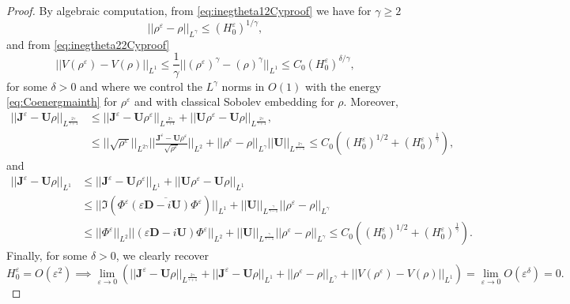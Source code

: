 \documentclass[a4paper, 15pt]{article}
\numberwithin{equation}{section}
\begin{document}
\begin{proof}
    By algebraic computation, from
  \eqref{eq:inegtheta12Cyproof} we have for $\gamma\geq2$ 
\begin{equation}
\label{eq:convtheta1osefCyproof}
    ||\rho^\varepsilon-\rho||_{L^\gamma}\leq (H^\varepsilon_0)^{1/\gamma},
\end{equation}
and from \eqref{eq:inegtheta22Cyproof}
\begin{equation}
\label{eq:convtheta2osefCyproof}
    ||V(\rho^\varepsilon)-V(\rho)||_{L^1}\leq\frac{1}{\gamma}||(\rho^\varepsilon)^\gamma-(\rho)^\gamma||_{L^1}\leq C_0(H^\varepsilon_0)^{\delta/\gamma},
\end{equation}
for some $\delta>0$ and where we control the $L^\gamma$ norms in $O(1)$ with the energy \eqref{eq:Coenergmainth} for $\rho^\varepsilon$ and with classical Sobolev embedding for $\rho$. Moreover,
\begin{align*}
     ||\textbf{J}^\varepsilon-\textbf{U}\rho||_{L^{\frac{2\gamma}{\gamma+1}}}&\leq  ||\textbf{J}^\varepsilon-\textbf{U}\rho^\varepsilon||_{L^{\frac{2\gamma}{\gamma+1}}}+||\textbf{U}\rho^\varepsilon-\textbf{U}\rho||_{L^{\frac{2\gamma}{\gamma+1}}},\\
     &\leq||\sqrt{\rho^\varepsilon}||_{L^{2\gamma}}||\frac{\textbf{J}^\varepsilon-\textbf{U}\rho^\varepsilon}{\sqrt{\rho^\varepsilon}}||_{L^{2}}+||\rho^\varepsilon-\rho||_{L^{\gamma}}||\textbf{U}||_{L^{\frac{2\gamma}{\gamma-1}}}\leq C_0((H^\varepsilon_0)^{1/2}+(H^\varepsilon_0)^{\frac{1}{\gamma}}),
\end{align*}
and
\begin{align*}
     ||\textbf{J}^\varepsilon-\textbf{U}\rho||_{L^1}&\leq  ||\textbf{J}^\varepsilon-\textbf{U}\rho^\varepsilon||_{L^{1}}+||\textbf{U}\rho^\varepsilon-\textbf{U}\rho||_{L^{1}}\\    &\leq||\Im(\Phi^\varepsilon\overline{(\varepsilon\textbf{D}-i\textbf{U})\Phi^\varepsilon})||_{L^{1}}+||\textbf{U}||_{L^{\frac{\gamma}{\gamma-1}}}||\rho^\varepsilon-\rho||_{L^{\gamma}} \\
     &\leq ||\Phi^\varepsilon||_{L^2}||(\varepsilon\textbf{D}-i\textbf{U})\Phi^\varepsilon||_{L^{2}}+||\textbf{U}||_{L^{\frac{\gamma}{\gamma-1}}}||\rho^\varepsilon-\rho||_{L^{\gamma}}\leq C_0((H^\varepsilon_0)^{1/2}+(H^\varepsilon_0)^{\frac{1}{\gamma}}).
\end{align*}
Finally, for some $\delta>0$, we clearly recover 
\begin{equation}
\label{eq:convtryoneoasefCyproof}
H^\varepsilon_0=O(\varepsilon^2)\implies\lim_{\varepsilon\to 0}(||\textbf{J}^\varepsilon-\textbf{U}\rho||_{L^{\frac{2\gamma}{\gamma+1}}}+||\textbf{J}^\varepsilon-\textbf{U}\rho||_{L^1}+||\rho^\varepsilon-\rho||_{L^\gamma}+||V(\rho^\varepsilon)-V(\rho)||_{L^1})=\lim_{\varepsilon\to 0}O(\varepsilon^{\delta})=0.
 \end{equation}
\end{proof}
\end{document}
